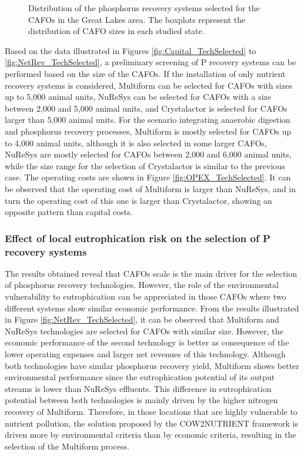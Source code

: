 \begin{refsection}[referencesCh4]
\begin{figure}[h!]
	\caption{Distribution of the phosphorus recovery systems selected for the CAFOs in the Great Lakes area. The boxplots represent the distribution of CAFO sizes in each studied state.}
	\label{fig:PTechs_Distribution}
\end{figure}

Based on the data illustrated in Figures \ref{fig:Capital_TechSelected} to \ref{fig:NetRev_TechSelected}, a preliminary screening of P recovery systems can be performed based on the size of the CAFOs. If the installation of only nutrient recovery systems is considered, Multiform can be selected for CAFOs with sizes up to 5,000 animal units, NuReSys can be selected for CAFOs with a size between 2,000 and 5,000 animal units, and Crystalactor is selected for CAFOs larger than 5,000 animal units. For the scenario integrating anaerobic digestion and phosphorus recovery processes, Multiform is mostly selected for CAFOs up to 4,000 animal units, although it is also selected in some larger CAFOs, NuReSys are mostly selected for CAFOs between 2,000 and 6,000 animal units, while the size range for the selection of Crystalactor is similar to the previous case. The operating costs are shown in Figure \ref{fig:OPEX_TechSelected}. It can be observed that the operating cost of Multiform is larger than NuReSys, and in turn the operating cost of this one is larger than Crystalactor, showing an opposite pattern than capital costs.

\subsubsection{Effect of local eutrophication risk on the selection of P recovery systems}
The results obtained reveal that CAFOs scale is the main driver for the selection of phosphorus recovery technologies. However, the role of the environmental vulnerability to eutrophication can be appreciated in those CAFOs where two different systems show similar economic performance. From the results illustrated in Figure \ref{fig:NetRev_TechSelected}, it can be observed that Multiform and NuReSys technologies are selected for CAFOs with similar size. However, the economic performance of the second technology is better as consequence of the lower operating expenses and larger net revenues of this technology. Although both technologies have similar phosphorus recovery yield, Multiform shows better environmental performance since the eutrophication potential of its output streams is lower than NuReSys effluents. This difference in eutrophication potential between both technologies is mainly driven by the higher nitrogen recovery of Multiform. Therefore, in those locations that are highly vulnerable to nutrient pollution, the solution proposed by the COW2NUTRIENT framework is driven more by environmental criteria than by economic criteria, resulting in the selection of the Multiform process.


\end{refsection}
